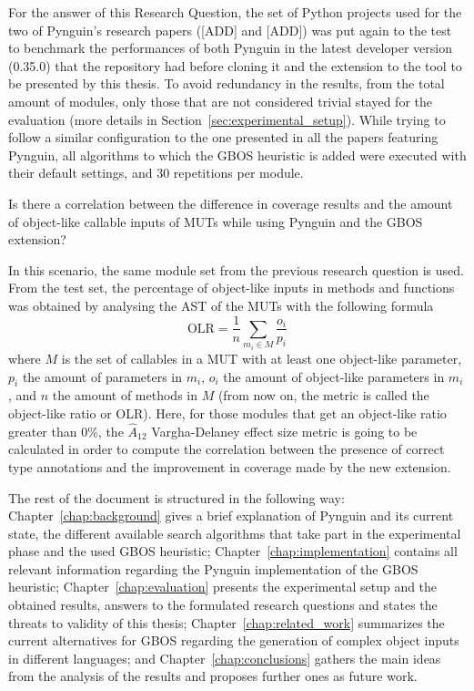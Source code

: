 \documentclass[%
  chapterprefix=false,%
  open=right,%
  twoside=true,%
  paper=a4,%
  logofile={Figures/logo.png},%
  thesistype=master,%
  UKenglish,%
]{se2thesis}
\begin{document}
For the answer of this Research Question, the set of Python projects used for the two of Pynguin's research papers ([ADD] and [ADD]) was put again to the test to benchmark the performances of both Pynguin in the latest developer version (0.35.0) that the repository had before cloning it and the extension to the tool to be presented by this thesis.
To avoid redundancy in the results, from the total amount of modules, only those that are not considered trivial stayed for the evaluation (more details in Section~\ref{sec:experimental_setup}).
While trying to follow a similar configuration to the one presented in all the papers featuring Pynguin, all algorithms to which the GBOS heuristic is added were executed with their default settings, and 30 repetitions per module.

\begin{resq}
  Is there a correlation between the difference in coverage results and the amount of object-like callable inputs of MUTs while using Pynguin and the GBOS extension?
\end{resq}

In this scenario, the same module set from the previous research question is used.
From the test set, the percentage of object-like inputs in methods and functions was obtained by analysing the AST of the MUTs with the following formula
\begin{equation}\label{eq:olr}
\text{OLR} = \frac{1}{n}\sum_{m_i \in M} \frac{o_i}{p_i}
\end{equation}
where \(M\) is the set of callables in a MUT with at least one object-like parameter, \(p_i\) the amount of parameters in \(m_i\), \(o_i\) the amount of object-like parameters in \(m_i\), and \(n\) the amount of methods in \(M\) (from now on, the metric is called the object-like ratio or OLR).
Here, for those modules that get an object-like ratio greater than 0\%, the \(\hat{A}_{12}\) Vargha-Delaney effect size metric is going to be calculated in order to compute the correlation between the presence of correct type annotations and the improvement in coverage made by the new extension. 

The rest of the document is structured in the following way: Chapter~\ref{chap:background} gives a brief explanation of Pynguin and its current state, the different available search algorithms that take part in the experimental phase and the used GBOS heuristic; Chapter~\ref{chap:implementation} contains all relevant information regarding the Pynguin implementation of the GBOS heuristic; Chapter~\ref{chap:evaluation} presents the experimental setup and the obtained results, answers to the formulated research questions and states the threats to validity of this thesis; Chapter~\ref{chap:related_work} summarizes the current alternatives for GBOS regarding the generation of complex object inputs in different languages; and Chapter~\ref{chap:conclusions} gathers the main ideas from the analysis of the results and proposes further ones as future work.
\end{document}
